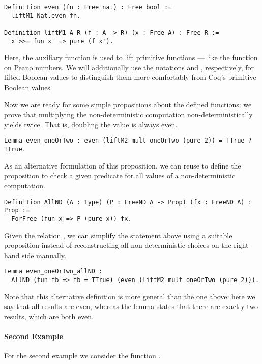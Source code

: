 \begin{verbatim}
Definition even (fn : Free nat) : Free bool :=
  liftM1 Nat.even fn.

Definition liftM1 A R (f : A -> R) (x : Free A) : Free R :=
  x >>= fun x' => pure (f x').
\end{verbatim}

Here, the auxiliary function  is used to lift primitive functions --- like the  function on Peano numbers.
We will additionally use the notations  and , respectively, for lifted Boolean values to distinguish them more comfortably from Coq's primitive Boolean values.

Now we are ready for some simple propositions about the defined functions: we prove that multiplying the non-deterministic computation  non-deterministically yields  twice.
That is, doubling the value  is always even.

\begin{verbatim}
Lemma even_oneOrTwo : even (liftM2 mult oneOrTwo (pure 2)) = TTrue ? TTrue.
\end{verbatim}

As an alternative formulation of this proposition, we can reuse  to define the proposition  to check a given predicate for all values of a non-deterministic computation.

\begin{verbatim}
Definition AllND (A : Type) (P : FreeND A -> Prop) (fx : FreeND A) : Prop :=
  ForFree (fun x => P (pure x)) fx.
\end{verbatim}

Given the relation , we can simplify the statement above using a suitable proposition instead of reconstructing all non-deterministic choices on the right-hand side manually.

\begin{verbatim}
Lemma even_oneOrTwo_allND :
  AllND (fun fb => fb = TTrue) (even (liftM2 mult oneOrTwo (pure 2))).
\end{verbatim}

Note that this alternative definition is more general than the one above: here we say that all results are even, whereas the lemma  states that there are exactly two results, which are both even.

\paragraph{Second Example}
For the second example we consider the function .

